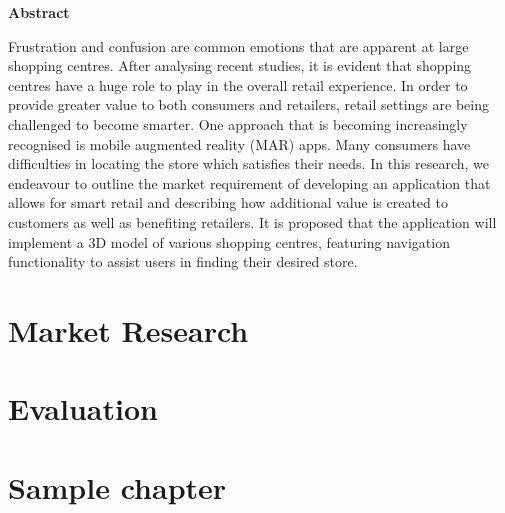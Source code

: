 \documentclass[12pt]{report}
\newcommand\blankpage{%
    \null
    \thispagestyle{empty}%
    \addtocounter{page}{-1}%
    \newpage}
\begin{document}
\begin{center}    
    \large
    \textbf{Abstract}\\
\end{center}
Frustration and confusion are common emotions that are apparent at large shopping centres. After analysing recent studies, it is evident that shopping centres have a huge role to play in the overall retail experience. In order to provide greater value to both consumers and retailers, retail settings are being challenged to become smarter. One approach that is becoming increasingly recognised is mobile augmented reality (MAR) apps. Many consumers have difficulties in locating the store which satisfies their needs. In this research, we endeavour to outline the market requirement of developing an application that allows for smart retail and describing how additional value is created to customers as well as benefiting retailers. It is proposed that the application will implement a 3D model of various shopping centres, featuring navigation functionality to assist users in finding their desired store.\\

\tableofcontents
\afterpage{\blankpage}

\chapter{Market Research}




\chapter{Evaluation}

\appendix
\chapter{Sample chapter}

\printbibliography
\end{document}

